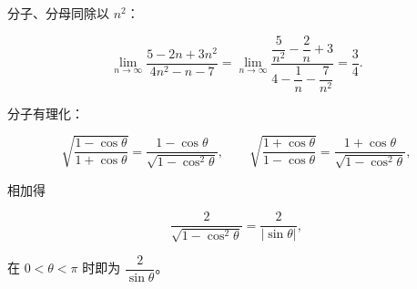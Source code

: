 \begin{answer}
分子、分母同除以 $n^2$：

\nopagebreak[4]
\[
\lim_{n\to\infty}\frac{5-2n+3n^2}{4n^2-n-7}
=\lim_{n\to\infty}\frac{\dfrac5{n^2}-\dfrac2n+3}{4-\dfrac1n-\dfrac7{n^2}}
=\frac34.
\]


分子有理化：

\nopagebreak[4]
\[
\sqrt{\frac{1-\cos\theta}{1+\cos\theta}}
=\frac{1-\cos\theta}{\sqrt{1-\cos^2\theta}},
\qquad
\sqrt{\frac{1+\cos\theta}{1-\cos\theta}}
=\frac{1+\cos\theta}{\sqrt{1-\cos^2\theta}},
\]

相加得

\nopagebreak[4]
\[
\frac{2}{\sqrt{1-\cos^2\theta}}=\frac{2}{\left|\sin\theta\right|},
\]

在 $0<\theta<\pi$ 时即为 $\dfrac{2}{\sin\theta}$。







\end{answer}
